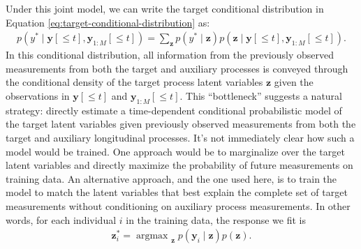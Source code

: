 \documentclass[12pt]{article}
\newcommand{\given}{\mid}
\DeclareMathOperator*{\argmax}{argmax\,\,}
\begin{document}
Under this joint model, we can write the target conditional distribution in Equation \ref{eq:target-conditional-distribution} as:
\begin{align}
\label{eq:predictive-density}
p(y^* \given \bm{y}[\le t], \bm{y}_{1:M}[\le t]) =
	\sum_{\bm{z}} p(y^* \given \bm{z}) p(\bm{z} \given \bm{y}[\le t], \bm{y}_{1:M}[\le t]).
\end{align}
In this conditional distribution, all information from the previously observed measurements from both the target and auxiliary processes is conveyed through the conditional density of the target process latent variables $\bm{z}$ given the observations in $\bm{y}[\le t]$ and $\bm{y}_{1:M}[\le t]$. This ``bottleneck'' suggests a natural strategy: directly estimate a time-dependent conditional probabilistic model of the target latent variables given previously observed measurements from both the target and auxiliary longitudinal processes. It's not immediately clear how such a model would be trained. One approach would be to marginalize over the target latent variables and directly maximize the probability of future measurements on training data. An alternative approach, and the one used here, is to train the model to match the latent variables that best explain the complete set of target measurements without conditioning on auxiliary process measurements. In other words, for each individual $i$ in the training data, the response we fit is
\begin{align}
\bm{z}^*_i = \argmax_{\bm{z}} p(\bm{y}_i \given \bm{z}) p(\bm{z}).
\end{align}
\end{document}
